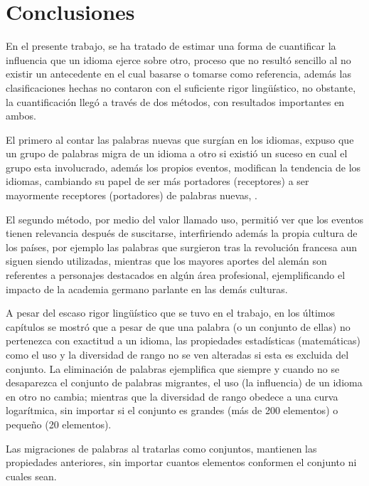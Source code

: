 \chapter{Conclusiones}

En el presente trabajo, se ha tratado de estimar una forma de cuantificar la influencia que un idioma ejerce sobre otro, proceso que no resultó sencillo al no existir un antecedente en el cual basarse o tomarse como referencia, además las clasificaciones hechas no contaron con el suficiente rigor lingüístico, no obstante, la cuantificación llegó a través de dos métodos, con resultados importantes en ambos. 

El primero al contar las palabras nuevas que surgían en los idiomas, expuso que un grupo de palabras migra de un idioma a otro si existió un suceso en cual el grupo esta involucrado, además los propios eventos, modifican la tendencia de los idiomas, cambiando su papel de ser más portadores (receptores) a ser mayormente receptores (portadores) de palabras nuevas, .  

El segundo método, por medio del valor llamado uso, permitió ver que los eventos tienen relevancia después de suscitarse, interfiriendo además la propia cultura de los países, por ejemplo las palabras que surgieron tras la revolución francesa aun siguen siendo utilizadas, mientras que los mayores aportes del alemán son referentes a personajes destacados en algún área profesional, ejemplificando el impacto de la academia germano parlante en las demás culturas.  

A pesar del escaso rigor lingüístico que se tuvo en el trabajo, en los últimos capítulos se mostró que a pesar de que una palabra (o un conjunto de ellas) no pertenezca con exactitud a un idioma, las propiedades estadísticas (matemáticas) como el uso y la diversidad de rango no se ven alteradas si esta es excluida del conjunto.  La eliminación de palabras ejemplifica que siempre y cuando no se desaparezca el conjunto de palabras migrantes,  el uso (la influencia) de un idioma en otro no cambia; mientras que la diversidad de rango obedece a una curva logarítmica, sin importar si el conjunto es grandes (más de 200 elementos) o pequeño (20 elementos).

Las migraciones de palabras al tratarlas como conjuntos, mantienen las propiedades anteriores, sin importar cuantos elementos conformen el conjunto ni cuales sean.  



